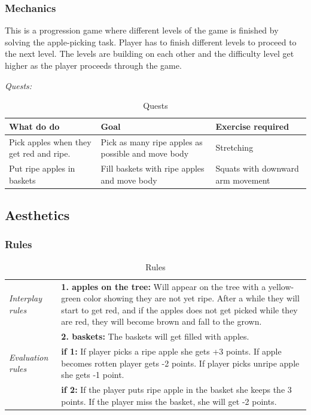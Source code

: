 \subsubsection{Mechanics} 
This is a progression game where different levels of the game is finished by solving the apple-picking task. Player has to finish different levels to proceed to the next level. The levels are building on each other and the difficulty level get higher as the player proceeds through the game.

\emph{Quests:} 

\begin{table}
     \begin{tabular}{|>{\raggedright}p{}|>{\raggedright}p{4cm}|p{}|}
       \hline
        \textbf{What do do} & \textbf{Goal} & \textbf{Exercise required}  \\ \hline
       Pick apples when they get red and ripe. & Pick as many ripe apples as possible and move body & Stretching  \\ \hline
       Put ripe apples in baskets & Fill baskets with ripe apples and move body &  Squats with downward arm movement \\ \hline
      \end{tabular}
      \caption[Quests in the "Apple Picking" game]{Quests}
    \label{tab:quests2}
 \end{table}

\subsection{Aesthetics}

\subsubsection{Rules} 

\begin{table} [H]
\centering
    \begin{tabular}{|p{}|p{}|}
       \hline
        \emph{Interplay rules} &  \textbf{1. apples on the tree:} Will appear on the tree with a yellow-green color showing they are not yet ripe. After a while they will start to get red, and if the apples does not get picked while they are red, they will become brown and fall to the grown. \\ \cline{2-2}
	     & \textbf{2. baskets:} The baskets will get filled with apples. \\ \hline
	     \emph{Evaluation rules} & \textbf{if 1:} If player picks a ripe apple she gets +3 points. If apple becomes rotten player gets  -2 points. If player picks unripe apple she gets -1 point. \\ \cline{2-2}
	       & \textbf{if 2:} If the player puts ripe apple in the basket she keeps the 3 points. If the player miss the basket, she will get -2 points.  \\ \hline
    \end{tabular}
    \caption[Rules for the "Apple Picking" game]{Rules}
    \label{tab:rules2}
\end{table}  

